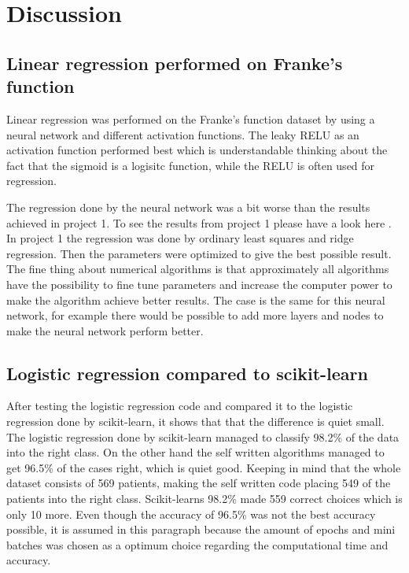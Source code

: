 \documentclass[../main.tex]{subfiles}
\begin{document}
\section{Discussion}
\subsection{Linear regression performed on Franke's function}
Linear regression was performed on the Franke's function dataset by using a neural network and different activation functions. The leaky RELU as an activation function performed best which is understandable thinking about the fact that the sigmoid is a logisitc function, while the RELU is often used for regression.

The regression done by the neural network was a bit worse than the results achieved in project 1. To see the results from project 1 please have a look here \cite{project1}. In project 1 the regression was done by ordinary least squares and ridge regression. Then the parameters were optimized to give the best possible result. The fine thing about numerical algorithms is that approximately all algorithms have the possibility to fine tune parameters and increase the computer power to make the algorithm achieve better results. The case is the same for this neural network, for example there would be possible to add more layers and nodes to make the neural network perform better. 


\subsection{Logistic regression compared to scikit-learn}
After testing the logistic regression code and compared it to the logistic regression done by scikit-learn, it shows that that the difference is quiet small. The logistic regression done by scikit-learn managed to classify 98.2\% of the data into the right class. On the other hand the self written algorithms managed to get 96.5\% of the cases right, which is quiet good. Keeping in mind that the whole dataset consists of 569 patients, making the self written code placing 549 of the patients into the right class. Scikit-learns 98.2\% made 559 correct choices which is only 10 more. Even though the accuracy of 96.5\% was not the best accuracy possible, it is assumed in this paragraph because the amount of epochs and mini batches was chosen as a optimum choice regarding the computational time and accuracy. 
\end{document}
